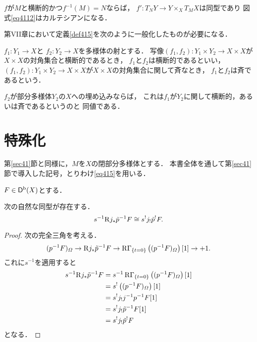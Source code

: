 \(f\)が\(M\)と横断的かつ\(f^{-1}(M)=N\)ならば，
\(f'\colon T_{N}Y\to Y\times_{X} T_{M}X\)は同型であり
図式\eqref{eq4112}はカルテシアンになる．

第VII章において定義\ref{def415}を次のように一般化したものが必要になる．

\begin{DFN}
    \(f_1\colon Y_1\to X\)と
    \(f_2\colon Y_2\to X\)を多様体の射とする．
    写像\(
        \left(f_1,f_2\right)\colon 
        Y_1\times Y_2\to X\times X
    \)が\(X\times X\)の対角集合と横断的であるとき，
    \(f_1\)と\(f_2\)は横断的であるといい，
    \(
        \left(f_1,f_2\right)\colon 
        Y_1\times Y_2\to X\times X
    \)が\(X\times X\)の対角集合に関して斉なとき，
    \(f_1\)と\(f_2\)は斉であるという．
\end{DFN}

\(f_2\)が部分多様体\(Y_2\)の\(X\)への埋め込みならば，
これは\(f_1\)が\(Y_2\)に関して横断的，あるいは斉であるというのと
同値である．

\section{特殊化}\label{sec42}
第\ref{sec41}節と同様に，\(M\)を\(X\)の閉部分多様体とする．
本書全体を通して第\ref{sec41}節で導入した記号，とりわけ\eqref{eq415}を用いる．

\(F\in\mathop{\mathsf{D}^\mathrm{b}}\nolimits(X)\)とする．

\begin{leftbar}
\begin{LMM}
    次の自然な同型が存在する．
    \[
        s^{-1}\mathrm{R}{j_{\ast}}\tilde{p}^{-1}F\cong
        s^{!}j_{!}\tilde{p}^{!}F.
    \]
\end{LMM}
\end{leftbar}

\begin{proof}
    次の完全三角を考える．
    \begin{equation}
        (p^{-1}F)_{\varOmega}\to 
        \mathrm{R}{j}_{\ast}\tilde{p}^{-1}F\to 
        \mathop{\mathrm{R}\hspace{-0pt}\Gamma}\nolimits_{\{t=0\}}\left((p^{-1}F)_{\varOmega}\right)[1]
        \to +1.
    \end{equation}
    これに\(s^{-1}\)を適用すると
    \begin{align*}
        s^{-1}\mathrm{R}{j}_{\ast}\tilde{p}^{-1}F
        &=s^{-1}\mathop{\mathrm{R}\hspace{-0pt}\Gamma}\nolimits_{\{t=0\}}\left((p^{-1}F)_{\varOmega}\right)[1]\\
        &=s^{!}\left((p^{-1}F)_{\varOmega}\right)[1]\\
        &=s^{!}j_{!}j^{-1}p^{-1}F[1]\\
        &=s^{!}j_{!}\tilde{p}^{-1}F[1]\\
        &=s^{!}j_{!}\tilde{p}^{!}F
    \end{align*}
    となる．
\end{proof}

